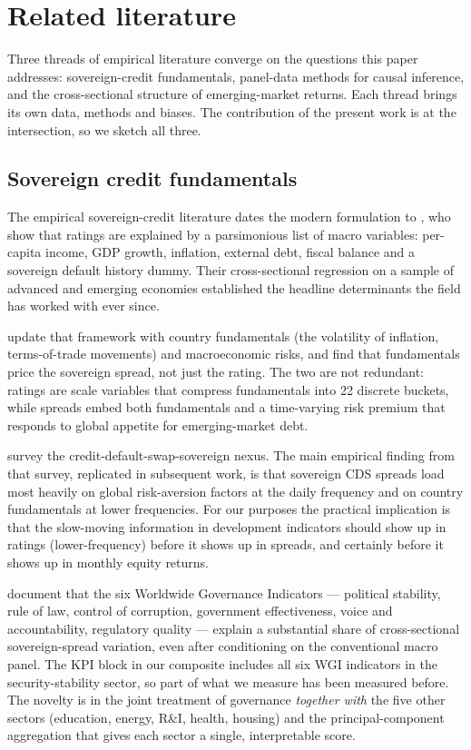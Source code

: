 \section{Related literature}\label{sec:literature}

Three threads of empirical literature converge on the questions this paper addresses: sovereign-credit fundamentals, panel-data methods for causal inference, and the cross-sectional structure of emerging-market returns. Each thread brings its own data, methods and biases. The contribution of the present work is at the intersection, so we sketch all three.

\subsection{Sovereign credit fundamentals}

The empirical sovereign-credit literature dates the modern formulation to \textcite{cantorpacker1996}, who show that ratings are explained by a parsimonious list of macro variables: per-capita income, GDP growth, inflation, external debt, fiscal balance and a sovereign default history dummy. Their cross-sectional regression on a sample of advanced and emerging economies established the headline determinants the field has worked with ever since.

\textcite{hilschernosbusch2010} update that framework with country fundamentals (the volatility of inflation, terms-of-trade movements) and macroeconomic risks, and find that fundamentals price the sovereign spread, not just the rating. The two are not redundant: ratings are scale variables that compress fundamentals into 22 discrete buckets, while spreads embed both fundamentals and a time-varying risk premium that responds to global appetite for emerging-market debt.

\textcite{augustinetal2014} survey the credit-default-swap-sovereign nexus. The main empirical finding from that survey, replicated in subsequent work, is that sovereign CDS spreads load most heavily on global risk-aversion factors at the daily frequency and on country fundamentals at lower frequencies. For our purposes the practical implication is that the slow-moving information in development indicators should show up in ratings (lower-frequency) before it shows up in spreads, and certainly before it shows up in monthly equity returns.

\textcite{kaufmannkraaymastruzzi2010} document that the six Worldwide Governance Indicators --- political stability, rule of law, control of corruption, government effectiveness, voice and accountability, regulatory quality --- explain a substantial share of cross-sectional sovereign-spread variation, even after conditioning on the conventional macro panel. The KPI block in our composite includes all six WGI indicators in the security-stability sector, so part of what we measure has been measured before. The novelty is in the joint treatment of governance \emph{together with} the five other sectors (education, energy, R\&I, health, housing) and the principal-component aggregation that gives each sector a single, interpretable score.

